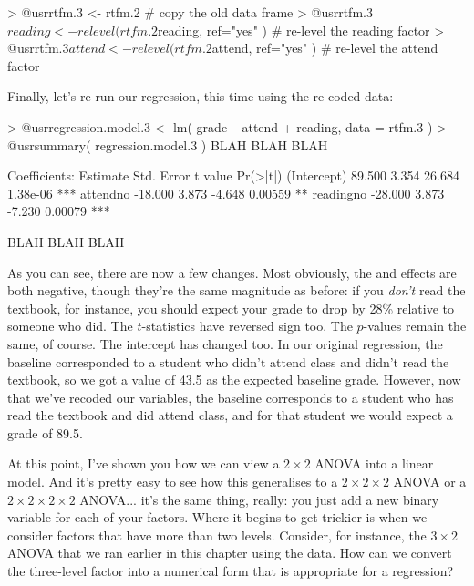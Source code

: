 \begin{rblock1}
> @usr{rtfm.3 <- rtfm.2}                                        # copy the old data frame
> @usr{rtfm.3$reading <- relevel( rtfm.2$reading, ref="yes" )}  # re-level the reading factor
> @usr{rtfm.3$attend <- relevel( rtfm.2$attend, ref="yes" )}    # re-level the attend factor
\end{rblock1}
Finally, let's re-run our regression, this time using the re-coded data:
\begin{rblock1}
> @usr{regression.model.3 <- lm( grade ~ attend + reading, data = rtfm.3 )}
> @usr{summary( regression.model.3 )}
BLAH BLAH BLAH

Coefficients:
            Estimate Std. Error t value Pr(>|t|)    
(Intercept)   89.500      3.354  26.684 1.38e-06 ***
attendno     -18.000      3.873  -4.648  0.00559 ** 
readingno    -28.000      3.873  -7.230  0.00079 ***

BLAH BLAH BLAH
\end{rblock1}
As you can see, there are now a few changes. Most obviously, the  and  effects are both negative, though they're the same magnitude as before: if you {\it don't} read the textbook, for instance, you should expect your grade to drop by 28\% relative to someone who did. The $t$-statistics have reversed sign too. The $p$-values remain the same, of course. The intercept has changed too. In our original regression, the baseline corresponded to a student who didn't attend class and didn't read the textbook, so we got a value of 43.5 as the expected baseline grade. However, now that we've recoded our variables, the baseline corresponds to a student who has read the textbook and did attend class, and for that student we would expect a grade of 89.5. 


At this point, I've shown you how we can view a $2\times 2$ ANOVA into a linear model. And it's pretty easy to see how this generalises to a $2 \times 2 \times 2$ ANOVA or a $2 \times 2 \times 2 \times 2$ ANOVA... it's the same thing, really: you just add a new binary variable for each of your factors. Where it begins to get trickier is when we consider factors that have more than two levels. Consider, for instance, the $3 \times 2$ ANOVA that we ran earlier in this chapter using the  data. How can we convert the three-level  factor into a numerical form that is appropriate for a regression?

